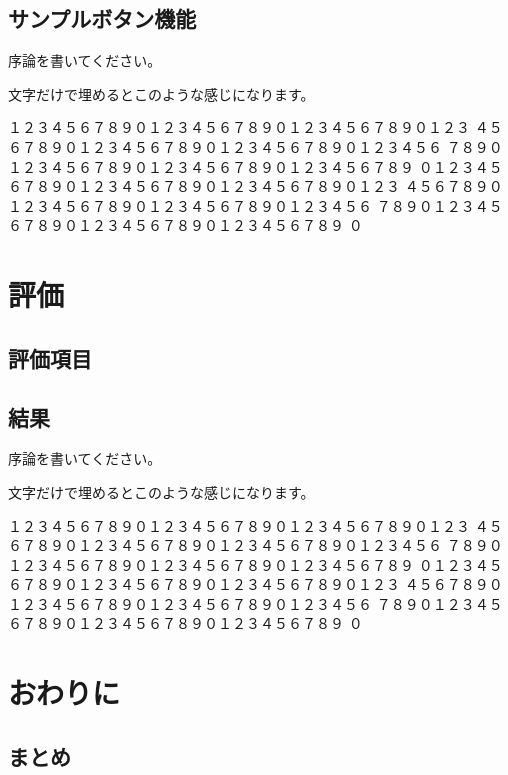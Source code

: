\documentclass{eniepaper}
\begin{document}
   \section{サンプルボタン機能}
   
   序論を書いてください。\newpage

   文字だけで埋めるとこのような感じになります。

   \noindent
   １２３４５６７８９０１２３４５６７８９０１２３４５６７８９０１２３
   ４５６７８９０１２３４５６７８９０１２３４５６７８９０１２３４５６
   ７８９０１２３４５６７８９０１２３４５６７８９０１２３４５６７８９
   ０１２３４５６７８９０１２３４５６７８９０１２３４５６７８９０１２３
   ４５６７８９０１２３４５６７８９０１２３４５６７８９０１２３４５６
   ７８９０１２３４５６７８９０１２３４５６７８９０１２３４５６７８９
   ０
   
   \chapter{評価}
   
   \section{評価項目}
   
   \section{結果}
   
   序論を書いてください。
   
   \newpage

   文字だけで埋めるとこのような感じになります。

   \noindent
   １２３４５６７８９０１２３４５６７８９０１２３４５６７８９０１２３
   ４５６７８９０１２３４５６７８９０１２３４５６７８９０１２３４５６
   ７８９０１２３４５６７８９０１２３４５６７８９０１２３４５６７８９
   ０１２３４５６７８９０１２３４５６７８９０１２３４５６７８９０１２３
   ４５６７８９０１２３４５６７８９０１２３４５６７８９０１２３４５６
   ７８９０１２３４５６７８９０１２３４５６７８９０１２３４５６７８９
   ０

   \chapter{おわりに}
   
   \section{まとめ}
   
\end{document}
